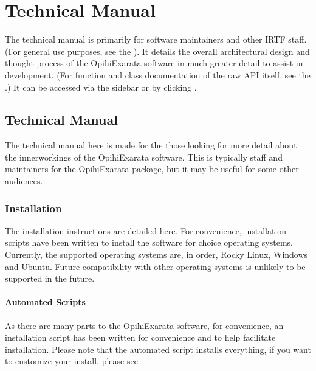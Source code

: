 \documentclass[letterpaper,11pt,english]{sphinxmanual}
\begin{document}
\chapter{Technical Manual}
\label{\detokenize{index:technical-manual}}\label{\detokenize{index:home-technical-manual}}
\sphinxAtStartPar
The technical manual is primarily for software maintainers and other IRTF
staff. (For general use purposes, see the {\hyperref[\detokenize{index:home-user-manual}]{}}).
It details the overall architectural design and thought process of the
OpihiExarata software in much greater detail to assist in development. (For
function and class documentation of the raw API itself, see the
{\hyperref[\detokenize{index:home-technical-manual}]{}}.) It can be accessed via the sidebar or by
clicking {\hyperref[\detokenize{technical/index::doc}]{}}.

\sphinxstepscope


\section{Technical Manual}
\label{\detokenize{technical/index:technical-manual}}\label{\detokenize{technical/index:technical-index}}\label{\detokenize{technical/index::doc}}
\sphinxAtStartPar
The technical manual here is made for the those looking for more detail about
the inner\sphinxhyphen{}workings of the OpihiExarata software. This is typically staff and
maintainers for the OpihiExarata package, but it may be useful for some other
audiences.

\sphinxstepscope


\subsection{Installation}
\label{\detokenize{technical/installation/index:installation}}\label{\detokenize{technical/installation/index:technical-installation}}\label{\detokenize{technical/installation/index::doc}}
\sphinxAtStartPar
The installation instructions are detailed here. For convenience, installation
scripts have been written to install the software for choice operating systems.
Currently, the supported operating systems are, in order, Rocky Linux, Windows
and Ubuntu. Future compatibility with other operating systems is unlikely to
be supported in the future.


\subsubsection{Automated Scripts}
\label{\detokenize{technical/installation/index:automated-scripts}}
\sphinxAtStartPar
As there are many parts to the OpihiExarata software, for convenience, an
installation script has been written for convenience and to help facilitate
installation. Please note that the automated script installs everything, if
you want to customize your install, please see
{\hyperref[\detokenize{technical/installation/index:technical-installation-manual-installation}]{}}.
\end{document}

